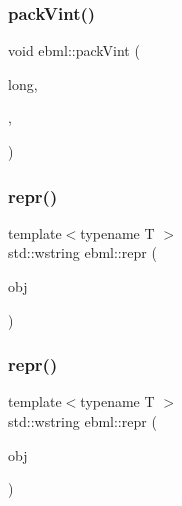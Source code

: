 \subsubsection{\texorpdfstring{pack\+Vint()}{packVint()}\hspace{0.1cm}{\footnotesize\ttfamily [2/2]}}
{\footnotesize\ttfamily void ebml\+::pack\+Vint (\begin{DoxyParamCaption}\item[{unsigned long}]{long,  }\item[{\mbox{\hyperlink{namespaceebml_a2ccdfb60b23efb51fe07f9d066e23604}{vint\+Width\+\_\+t}}}]{,  }\item[{char $\ast$}]{ }\end{DoxyParamCaption})}

\mbox{\label{namespaceebml_a5478072bc68f4104a63a83d14785c9d2}} 
\subsubsection{\texorpdfstring{repr()}{repr()}\hspace{0.1cm}{\footnotesize\ttfamily [1/10]}}
{\footnotesize\ttfamily template$<$typename T $>$ \\
std\+::wstring ebml\+::repr (\begin{DoxyParamCaption}\item[{const std\+::shared\+\_\+ptr$<$ T $>$ \&}]{obj }\end{DoxyParamCaption})}

\mbox{\label{namespaceebml_a3c5e99350812f2a7182e2de8f1e46b3b}} 
\subsubsection{\texorpdfstring{repr()}{repr()}\hspace{0.1cm}{\footnotesize\ttfamily [2/10]}}
{\footnotesize\ttfamily template$<$typename T $>$ \\
std\+::wstring ebml\+::repr (\begin{DoxyParamCaption}\item[{const T \&}]{obj }\end{DoxyParamCaption})}

\mbox{\label{namespaceebml_ac8f264e994bf8c22e2a6a9624460ddf9}} 
